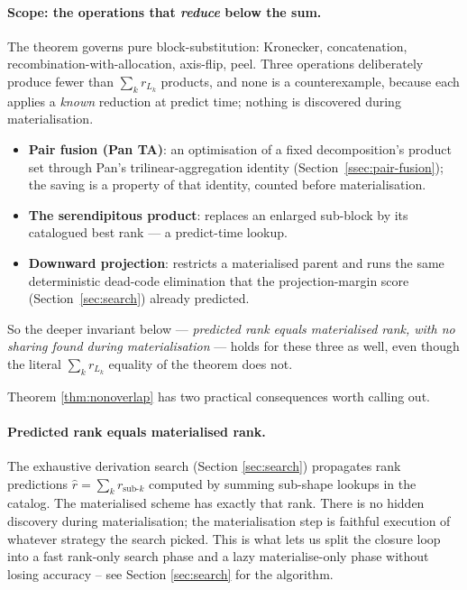 \paragraph{Scope: the operations that \emph{reduce} below the sum.} The
theorem governs pure block-substitution: Kronecker, concatenation,
recombination-with-allocation, axis-flip, peel. Three operations
deliberately produce fewer than \(\sum_k r_{L_k}\) products, and none is a
counterexample, because each applies a \emph{known} reduction at predict
time; nothing is discovered during materialisation.
\begin{itemize}[itemsep=2pt]
  \item \textbf{Pair fusion (Pan TA)}: an optimisation of a fixed
    decomposition's product set through Pan's trilinear-aggregation
    identity (Section~\ref{ssec:pair-fusion}); the saving is a property of
    that identity, counted before materialisation.
  \item \textbf{The serendipitous product}: replaces an enlarged sub-block
    by its catalogued best rank --- a predict-time lookup.
  \item \textbf{Downward projection}: restricts a materialised parent and
    runs the same deterministic dead-code elimination that the
    projection-margin score (Section~\ref{sec:search}) already predicted.
\end{itemize}
So the deeper invariant below --- \emph{predicted rank equals materialised
rank, with no sharing found during materialisation} --- holds for these
three as well, even though the literal \(\sum_k r_{L_k}\) equality of the
theorem does not.

Theorem \ref{thm:nonoverlap} has two practical consequences worth
calling out.

\paragraph{Predicted rank equals materialised rank.} The exhaustive derivation
search (Section \ref{sec:search}) propagates rank predictions
\(\hat r = \sum_k r_{\text{sub-}k}\) computed by summing sub-shape
lookups in the catalog. The materialised scheme has exactly that
rank. There is no hidden discovery during materialisation; the
materialisation step is faithful execution of whatever strategy the
search picked. This is what lets us split the closure loop into a
fast rank-only search phase and a lazy materialise-only phase
without losing accuracy -- see Section \ref{sec:search} for the
algorithm.

